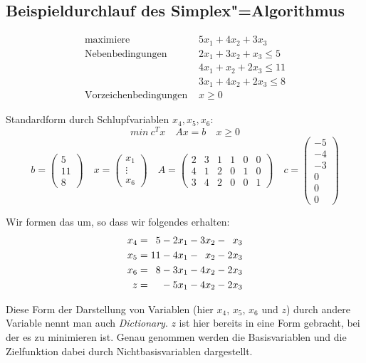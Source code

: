 \subsection{Beispieldurchlauf des Simplex"=Algorithmus}
\begin{Bsp}
  \begin{align*}
    \text{maximiere } & 5x_1 + 4x_2 + 3x_3 \\ 
    \text{Nebenbedingungen } & 2x_1 + 3x_2 + x_3 \le 5\\
    & 4x_1 + x_2 + 2x_3 \le 11\\
    & 3x_1 + 4x_2 + 2x_3 \le 8\\
    \text{Vorzeichenbedingungen } & x\ge 0
  \end{align*}
  
  Standardform durch Schlupfvariablen $x_4, x_5, x_6$:
  \[ min~c^Tx \quad Ax = b \quad x \ge 0 \]
  \[ b=\begin{pmatrix} 5 \\ 11 \\ 8 \end{pmatrix} \quad x=\begin{pmatrix} x_1 \\ \vdots \\ x_6 \end{pmatrix} \quad A=\begin{pmatrix} 2 & 3 & 1 & 1 & 0 & 0 \\ 4 & 1 & 2 & 0 & 1 & 0 \\ 3 & 4 & 2& 0 & 0 & 1 \end{pmatrix} \quad c=\begin{pmatrix} -5 \\ -4 \\ -3 \\ 0 \\ 0 \\ 0 \end{pmatrix}\]
  
  Wir formen das um, so dass wir folgendes erhalten:
  \begin{align*}
    x_4 &= \hphantom{1}5 -2x_1 -3x_2 -\hphantom{2}x_3\\
    x_5 &= 11 -4x_1 -\hphantom{3}x_2 -2x_3 \\
    x_6 &= \hphantom{1}8 -3x_1 -4 x_2 -2 x_3 \\
    z &= \hphantom{11} -5x_1 -4x_2 - 2x_3
  \end{align*}
  
  Diese Form der Darstellung von Variablen (hier $x_4$, $x_5$, $x_6$ und $z$) durch andere Variable nennt man auch \textit{Dictionary}. $z$ ist hier bereits in eine Form gebracht, bei der es zu minimieren ist. Genau genommen werden die Basisvariablen und die Zielfunktion dabei durch Nichtbasisvariablen dargestellt.
  

\end{Bsp}
